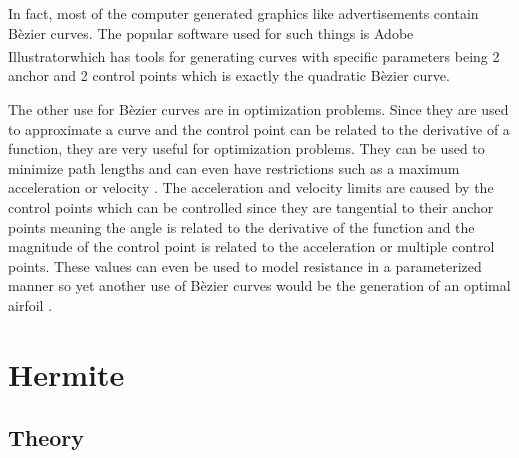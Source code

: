 \documentclass[12pt, letterpaper]{article}
\begin{document}
In fact, most of the computer generated graphics like advertisements contain B\`ezier curves. The popular
software used for such things is Adobe Illustrator\textsuperscript\textregistered which has tools for
generating curves with specific parameters being 2 anchor and 2 control points which is exactly the
quadratic B\`ezier curve. 

The other use for B\`ezier curves are in optimization problems. Since they are used to approximate a 
curve and the control point can be related to the derivative of a function, they are very useful for
optimization problems. They can be used to minimize path lengths \citep{bezierPaths} and can even have
restrictions such as a maximum acceleration or velocity \citep{bezierSoccerPaths}. The acceleration and
velocity limits are caused by the control points which can be controlled since they are tangential to
their anchor points meaning the angle is related to the derivative of the function and the magnitude of
the control point is related to the acceleration or multiple control points. These values can even be 
used to model resistance in a parameterized manner so yet another use of B\`ezier curves would be the
generation of an optimal airfoil \citep{bezierAirfoil}.

\section{Hermite}

\subsection{Theory}
\end{document}
